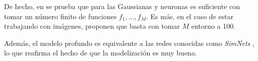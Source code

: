 
De hecho, en \cite{matematicas:principal} se prueba que para las Gaussianas y neuronas es suficiente con tomar un número finito de funciones ${f_1, \ldots, f_M}$. Es más, en el caso de estar trabajando con imágenes, proponen que basta con tomar $M$ entorno a 100.

Además, el modelo profundo es equivalente a las redes conocidas como \textit{SimNets} \cite{matematicas:principal}, lo que reafirma el hecho de que la modelización es muy buena.
